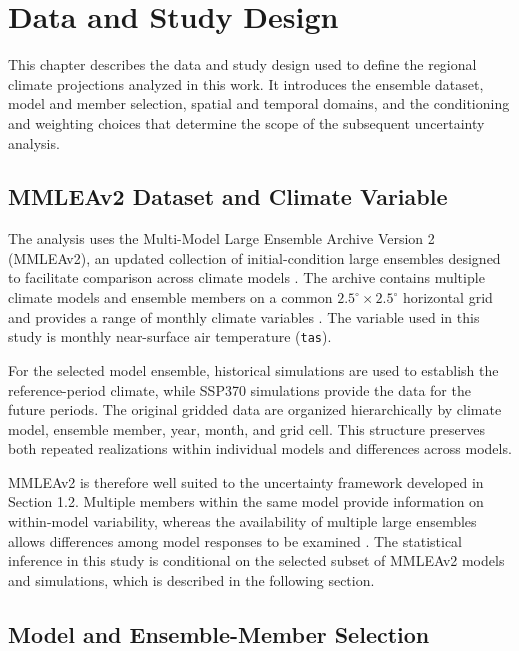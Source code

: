 \documentclass[
]{krantz}
\begin{document}
\section{Data and Study Design}\label{data-and-study-design}

This chapter describes the data and study design used to define the regional climate projections analyzed in this work. It introduces the ensemble dataset, model and member selection, spatial and temporal domains, and the conditioning and weighting choices that determine the scope of the subsequent uncertainty analysis.

\subsection{MMLEAv2 Dataset and Climate Variable}\label{mmleav2-dataset-and-climate-variable}

The analysis uses the Multi-Model Large Ensemble Archive Version 2 (MMLEAv2), an updated collection of initial-condition large ensembles designed to facilitate comparison across climate models \citep{Maher2025}. The archive contains multiple climate models and ensemble members on a common \(2.5^\circ \times 2.5^\circ\) horizontal grid and provides a range of monthly climate variables \citep{Maher2025}. The variable used in this study is monthly near-surface air temperature (\texttt{tas}).

For the selected model ensemble, historical simulations are used to establish the reference-period climate, while SSP370 simulations provide the data for the future periods. The original gridded data are organized hierarchically by climate model, ensemble member, year, month, and grid cell. This structure preserves both repeated realizations within individual models and differences across models.

MMLEAv2 is therefore well suited to the uncertainty framework developed in Section 1.2. Multiple members within the same model provide information on within-model variability, whereas the availability of multiple large ensembles allows differences among model responses to be examined \citep{Maher2025}. The statistical inference in this study is conditional on the selected subset of MMLEAv2 models and simulations, which is described in the following section.

\subsection{Model and Ensemble-Member Selection}\label{model-and-ensemble-member-selection}
\end{document}
